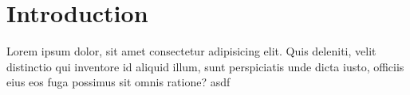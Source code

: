 \section{Introduction}
Lorem ipsum dolor, sit amet consectetur adipisicing elit.
Quis deleniti, velit distinctio qui inventore id aliquid illum,
sunt perspiciatis unde dicta iusto, officiis eius eos fuga possimus sit omnis ratione?
\cite{logo_hska}asdf